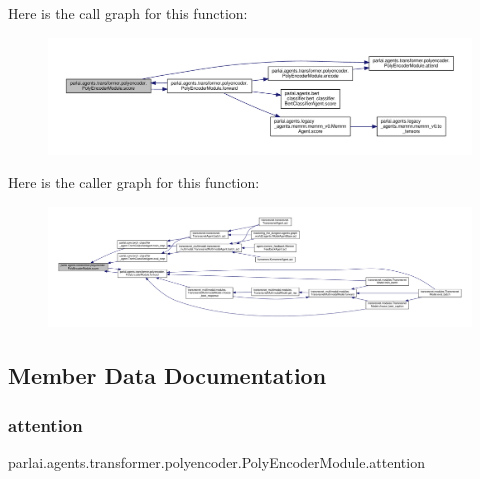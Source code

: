 Here is the call graph for this function\+:
\nopagebreak
\begin{figure}[H]
\begin{center}
\leavevmode
\includegraphics[width=350pt]{classparlai_1_1agents_1_1transformer_1_1polyencoder_1_1PolyEncoderModule_a52218a8c0594ff4d5bf8e666dc38f508_cgraph}
\end{center}
\end{figure}
Here is the caller graph for this function\+:
\nopagebreak
\begin{figure}[H]
\begin{center}
\leavevmode
\includegraphics[width=350pt]{classparlai_1_1agents_1_1transformer_1_1polyencoder_1_1PolyEncoderModule_a52218a8c0594ff4d5bf8e666dc38f508_icgraph}
\end{center}
\end{figure}


\subsection{Member Data Documentation}
\mbox{\label{classparlai_1_1agents_1_1transformer_1_1polyencoder_1_1PolyEncoderModule_a8fab02ef33d1e1ee413e4bcbe25aa03b}} 
\subsubsection{\texorpdfstring{attention}{attention}}
{\footnotesize\ttfamily parlai.\+agents.\+transformer.\+polyencoder.\+Poly\+Encoder\+Module.\+attention}



